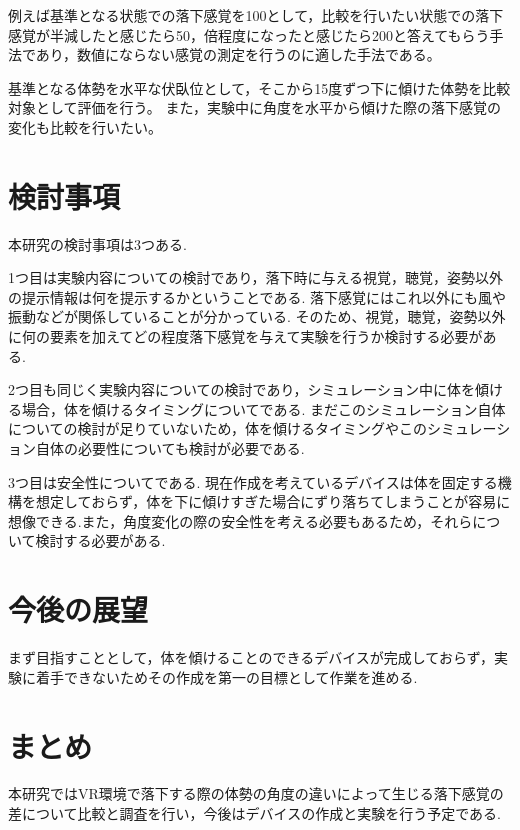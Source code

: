 \documentclass[uplatex]{jsarticle}
\begin{document}
例えば基準となる状態での落下感覚を100として，比較を行いたい状態での落下感覚が半減したと感じたら50，倍程度になったと感じたら200と答えてもらう手法であり，数値にならない感覚の測定を行うのに適した手法である。

基準となる体勢を水平な伏臥位として，そこから15度ずつ下に傾けた体勢を比較対象として評価を行う。
また，実験中に角度を水平から傾けた際の落下感覚の変化も比較を行いたい。

\section{検討事項}
本研究の検討事項は3つある.

1つ目は実験内容についての検討であり，落下時に与える視覚，聴覚，姿勢以外の提示情報は何を提示するかということである.
落下感覚にはこれ以外にも風や振動などが関係していることが分かっている\cite{青木誠也2018音と風によって浮遊感を感じさせる装置の制作}.
そのため、視覚，聴覚，姿勢以外に何の要素を加えてどの程度落下感覚を与えて実験を行うか検討する必要がある.

2つ目も同じく実験内容についての検討であり，シミュレーション中に体を傾ける場合，体を傾けるタイミングについてである.
まだこのシミュレーション自体についての検討が足りていないため，体を傾けるタイミングやこのシミュレーション自体の必要性についても検討が必要である.

3つ目は安全性についてである.
現在作成を考えているデバイスは体を固定する機構を想定しておらず，体を下に傾けすぎた場合にずり落ちてしまうことが容易に想像できる.また，角度変化の際の安全性を考える必要もあるため，それらについて検討する必要がある.

\section{今後の展望}
まず目指すこととして，体を傾けることのできるデバイスが完成しておらず，実験に着手できないためその作成を第一の目標として作業を進める.

\section{まとめ}
本研究ではVR環境で落下する際の体勢の角度の違いによって生じる落下感覚の差について比較と調査を行い，今後はデバイスの作成と実験を行う予定である.


 
\end{document}
